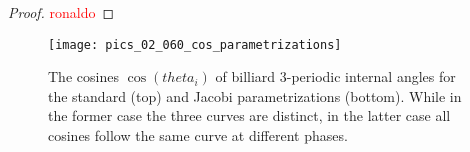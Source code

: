 \begin{proof}
\textcolor{red}{ronaldo}
\end{proof}
\begin{figure}
    \centering
    \texttt{[image: pics\_02\_060\_cos\_parametrizations]}
    \caption{The cosines $\cos(theta_i)$ of billiard 3-periodic internal angles for the standard (top) and Jacobi parametrizations (bottom). While in the former case the three curves are distinct, in the latter case all cosines follow the same curve at different phases.}
    \label{fig:02-jacobi-cos-param}
\end{figure}